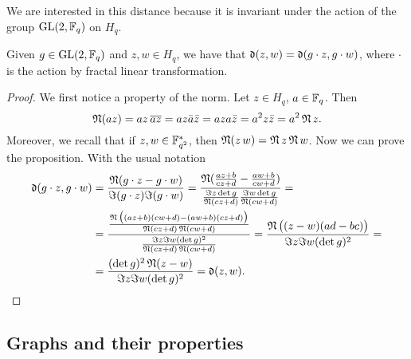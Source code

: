 We are interested in this distance because it is invariant under the action of the group $\operatorname{GL}(2,{\mathbb F}_q)$ on $H_q$.
\begin{prop}
Given $g \in \operatorname{GL}(2,{\mathbb F}_q)$ and $z,w \in H_q$, we have that $\operatorname{\mathfrak{d}} (z,w)=\operatorname{\mathfrak{d}}(g \cdot z,g\cdot w)$,
where $\cdot$ is the action by fractal linear transformation.
\begin{proof}
We first notice a property of the norm. Let $z\in H_q$, $a\in {\mathbb F}_q$. Then
\begin{equation}
\operatorname{\mathfrak{N}} (az) = az \, \overline{az} = az\bar{a}\bar{z}=aza\bar{z}=a^2 z \bar{z}=a^2 \operatorname{\mathfrak{N}} z.
\end{equation}
Moreover, we recall that if $z,w \in {\mathbb F}_{q^2}^{*}$, then $\operatorname{\mathfrak{N}} (z\,w)= \operatorname{\mathfrak{N}} z \operatorname{\mathfrak{N}} w$.
Now we can prove the proposition. With the usual notation
	\begin{align*}
	\operatorname{\mathfrak{d}} (g\cdot z,g\cdot w)&=\frac{\operatorname{\mathfrak{N}} (g\cdot z-g\cdot w)}{\Im (g\cdot z) \Im (g\cdot w)}
							  =\frac{\operatorname{\mathfrak{N}}(\frac{az+b}{cz+d} -
							   \frac{aw+b}{cw+d})}{\frac{\Im z \det g}{\operatorname{\mathfrak{N}} (cz+d)}\frac{\Im w \det g}{\operatorname{\mathfrak{N}} (cw+d)}}=\\
							  &=\frac{\frac{\operatorname{\mathfrak{N}}\big((az+b)(cw+d)-(aw+b)(cz+d)\big)}{\operatorname{\mathfrak{N}}(cz+d)\operatorname{\mathfrak{N}} (cw+d)}}
							  {\frac{\Im z \Im w (\det g)^2}{\operatorname{\mathfrak{N}} (cz+d)\operatorname{\mathfrak{N}} (cw+d)}}
							  =\frac{\operatorname{\mathfrak{N}} \big((z-w)(ad-bc)\big)}{\Im z \Im w (\det g)^2}=\\
							  &=\frac{(\det g)^2 \operatorname{\mathfrak{N}} (z-w)}{\Im z \Im w (\det g)^2}=\operatorname{\mathfrak{d}} (z,w).
	\end{align*}


\end{proof}
\end{prop}
\subsection{Graphs and their properties}
